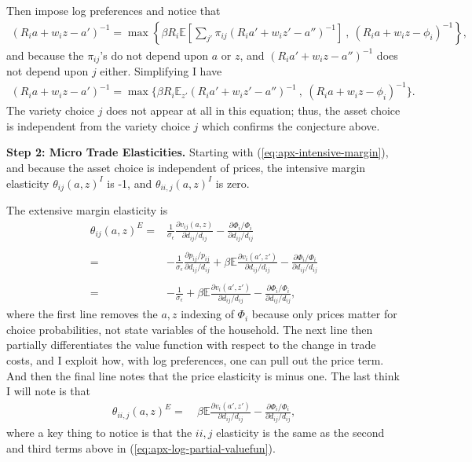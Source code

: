 \documentclass[12pt,pdftex]{article}
\begin{document}
\begin{onehalfspacing}
Then impose log preferences and notice that
\begin{align}
(R_{i}a + w_{i}z - a')^{-1} = \max \left\{ \beta R_{i} \mathbb{E} \left[ \sum_{j'} \pi_{ij} (R_{i}a' + w_{i}z' - a'')^{-1} \right] \ , \   (R_{i} a + w_{i}z - \phi_{i})^{-1} \right \},
\end{align}
and because the $\pi_{ij}$'s do not depend upon $a$ or $z$, and $(R_{i}a' + w_{i}z - a'')^{-1}$ does not depend upon $j$ either. Simplifying I have
\begin{align}
(R_{i}a + w_{i}z - a')^{-1} = \max \bigg \{ \beta R_{i} \mathbb{E}_{z'} (R_{i}a' + w_{i}z' - a'')^{-1}  \ , \   (R_{i} a + w_{i}z - \phi_{i})^{-1}  \bigg \}.
\end{align}
The variety choice $j$ does not appear at all in this equation; thus, the asset choice is independent from the variety choice $j$ which confirms the conjecture above.

\textbf{Step 2: Micro Trade Elasticities.} Starting with (\ref{eq:apx-intensive-margin}), and because the asset choice is independent of prices, the intensive margin elasticity $\theta_{ij}(a,z)^I$ is -1, and $\theta_{ii,j}(a,z)^I$ is zero.

The extensive margin elasticity is
\begin{align}
\theta_{ij}(a,z)^E =& \frac{1}{\sigma_{\epsilon}}\frac{\partial v_{ij}(a,z)}{\partial d_{ij}/d_{ij}} -  \frac{\partial \Phi_{i} / \Phi_{i}}{\partial d_{ij}/d_{ij}}\\
\nonumber \\
=& -\frac{1}{\sigma_{\epsilon}}\frac{\partial p_{ij} / p_{ij}}{\partial d_{ij}/d_{ij}} + \beta \mathbb{E} \frac{\partial v_{i}(a',z')}{\partial d_{ij}/d_{ij}} -  \frac{\partial \Phi_{i} / \Phi_{i}}{\partial d_{ij}/d_{ij}} \\
\nonumber \\
=& -\frac{1}{\sigma_{\epsilon}} + \beta \mathbb{E} \frac{\partial v_{i}(a',z')}{\partial d_{ij}/d_{ij}} -  \frac{\partial \Phi_{i} / \Phi_{i}}{\partial d_{ij}/d_{ij}},
\label{eq:apx-log-partial-valuefun}
\end{align}
where the first line removes the $a,z$ indexing of $\Phi_i$ because only prices matter for choice probabilities, not state variables of the household. The next line then partially differentiates the value function with respect to the change in trade costs, and I exploit how, with log preferences, one can pull out the price term. And then the final line notes that the price elasticity is minus one. The last think I will note is that
\begin{align}
\theta_{ii,j}(a,z)^E =& \ \beta \mathbb{E} \frac{\partial v_{i}(a',z')}{\partial d_{ij}/d_{ij}} -  \frac{\partial \Phi_{i} / \Phi_{i}}{\partial d_{ij}/d_{ij}},
\end{align}
where a key thing to notice is that the $ii,j$ elasticity is the same as the second and third terms above in (\ref{eq:apx-log-partial-valuefun}).



\end{onehalfspacing}
\end{document}

